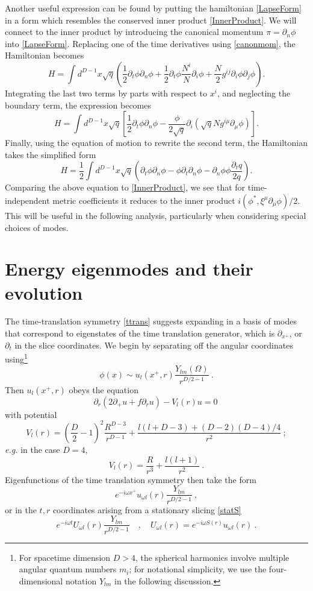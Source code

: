 \documentclass[12pt]{article}
\numberwithin{equation}{section}
\newcommand{\beq}{\begin{equation}}
\newcommand{\eeq}{\end{equation}}
\begin{document}
Another  useful expression can be found by putting the hamiltonian \eqref{LapseForm} in a form which resembles the conserved inner product \eqref{InnerProduct}. We will connect to the inner product by introducing the canonical momentum $\pi=\partial_n\phi$ into \eqref{LapseForm}. Replacing one of the time derivatives using \eqref{canonmom}, the Hamiltonian becomes
\beq
H= \int d^{D-1}x \sqrt{q}
\left(\frac{1}{2}\partial_t \phi \partial_n\phi + \frac{1}{2}\partial_t\phi\frac{N^i}{N}\partial_i  \phi  +\frac{N}{2}g^{ij} \partial_i \phi \partial_j \phi \right).
\eeq 
Integrating the last two terms by parts with respect to  $x^i$, and neglecting the boundary term, the expression becomes
\beq
H= \int d^{D-1}x \sqrt{q} \left[\frac{1}{2}\partial_t \phi \partial_n\phi -\frac{\phi}{2\sqrt{q}} \partial_i \left(\sqrt{q} N g^{i \mu} \partial_{\mu} \phi \right)\right].
\eeq 
Finally, using the equation of motion to rewrite the second term, the Hamiltonian takes the simplified form
\beq\label{IPform}
H= \frac{1}{2} \int d^{D-1}x \sqrt{q} \left(\partial_t \phi \partial_n\phi -\phi \partial_t \partial_n \phi -\partial_n\phi \phi \frac{\partial_t q}{2q} \right).
\eeq 
Comparing the above equation to \eqref{InnerProduct}, we see that for time-independent metric coefficients it reduces to the inner product $i(\phi^*,\xi^\mu\partial_\mu \phi)/2$.  This will be useful in the following analysis, particularly when considering special choices of modes.

\section{Energy eigenmodes and their evolution}\label{EnergyEmodes}

The time-translation symmetry \eqref{ttrans} suggests expanding in a basis of modes that correspond to eigenstates of the time translation generator, which is  $\partial_{x^+}$, or $\partial_t$ in the slice coordinates. We begin by separating off the angular coordinates using\footnote{For spacetime dimension $D>4$, the spherical harmonics involve multiple angular quantum numbers $m_i$; for notational simplicity, we use the four-dimensional notation $Y_{lm}$ in the following discussion.}
\beq\label{phisep}
\phi(x)\sim u_{l}(x^+,r) \frac{Y_{lm}(\Omega)}{r^{D/2-1}}\ .
\eeq
Then $u_{l}(x^+,r)$ obeys the equation
\beq\label{rxpeq}
\partial_r\left(2\partial_+ u + f\partial_r u\right) - V_l(r)u =0\ 
\eeq
with potential
\beq
V_l(r)= \left(\frac{D}{2}-1\right)^2 \frac{R^{D-3}}{r^{D-1}} +\frac{l(l+D-3)+(D-2)(D-4)/4}{r^{2}}\ ;
\eeq
{\it e.g.} in the case $D=4$, 
\beq\label{4dpot}
V_l(r) = \frac{R}{r^3} + \frac{l(l+1)}{r^2}\ .
\eeq
Eigenfunctions of the time translation symmetry then take the form
\beq\label{Eefcns}
e^{-i\omega x^+}u_{\omega l }(r) \frac{Y_{lm}}{r^{D/2-1}}\ ,
\eeq
or in the $t,r$ coordinates arising from a stationary slicing \eqref{statS}
\beq\label{Trsolns}
e^{-i\omega t}U_{\omega l}(r) \frac{Y_{lm}}{r^{D/2-1}}\quad ,\quad U_{\omega l}(r)= e^{-i\omega S(r)}u_{\omega l}(r)\ .
\eeq
\end{document}
